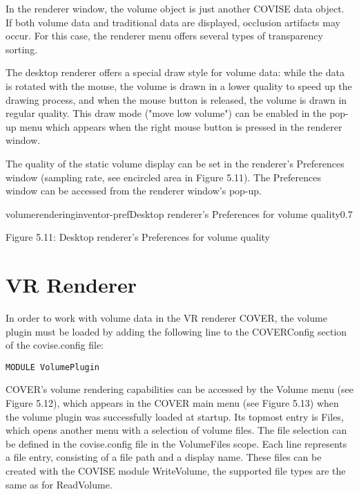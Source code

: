 In the renderer window, the volume object is just another COVISE data object. If both volume data 
and traditional data are displayed, occlusion artifacts may occur. 
For this case, the renderer menu offers several types of transparency sorting. 

The desktop renderer offers a special draw style for volume data: while the data is rotated with the mouse,
the volume is drawn in a lower quality to speed up the drawing process, and when the mouse button is
released, the volume is drawn in regular quality. 
This draw mode ("move low volume") can be enabled in the pop-up menu which appears 
when the right mouse button is pressed in the renderer window.

The quality of the static volume display can be set in the renderer's 
Preferences window (sampling rate, see encircled area in Figure 5.11). 
The Preferences window can be accessed from the renderer window's pop-up.

\begin{covimg}{volumerendering}{inventor-pref}{Desktop renderer's Preferences for volume quality}{0.7}\end{covimg}
\begin{htmlonly}
Figure 5.11: Desktop renderer's Preferences for volume quality
\vspace{0.5cm}
\end{htmlonly}

\clearpage

\section{VR Renderer}

In order to work with volume data in the VR renderer COVER, the volume plugin must be loaded by adding the following line 
to the COVERConfig section of the covise.config file:

\begin{verbatim}
MODULE VolumePlugin
\end{verbatim}

COVER's volume rendering capabilities can be accessed by the Volume menu (see Figure 5.12), 
which appears in the COVER main menu (see Figure 5.13) when the volume plugin was 
successfully loaded at startup. Its topmost entry is Files, which opens another 
menu with a selection of volume files. The file selection can be defined in the covise.config file in the VolumeFiles 
scope. Each line represents a file entry, consisting of a file path and a display name. These
files can be created with the COVISE module WriteVolume, the supported file types are the same as
for ReadVolume.

